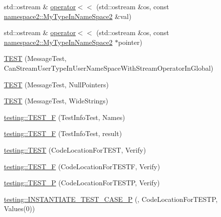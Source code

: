 \begin{DoxyCompactItemize}
std\+::ostream \& \mbox{\hyperlink{_obj__test_2lib_2googletest-release-1_88_81_2googletest_2test_2gtest__unittest_8cc_ab3cbb7adaeba5049e2c1907523f0c3e8}{operator$<$$<$}} (std\+::ostream \&os, const \mbox{\hyperlink{classnamespace2_1_1_my_type_in_name_space2}{namespace2\+::\+My\+Type\+In\+Name\+Space2}} \&val)
\item 
std\+::ostream \& \mbox{\hyperlink{_obj__test_2lib_2googletest-release-1_88_81_2googletest_2test_2gtest__unittest_8cc_a839d8a189a0c52bb7899a5b4b4b07ed1}{operator$<$$<$}} (std\+::ostream \&os, const \mbox{\hyperlink{classnamespace2_1_1_my_type_in_name_space2}{namespace2\+::\+My\+Type\+In\+Name\+Space2}} $\ast$pointer)
\item 
\mbox{\hyperlink{_obj__test_2lib_2googletest-release-1_88_81_2googletest_2test_2gtest__unittest_8cc_ad2b886ecfee880b5012c8d41b448f110}{T\+E\+ST}} (Message\+Test, Can\+Stream\+User\+Type\+In\+User\+Name\+Space\+With\+Stream\+Operator\+In\+Global)
\item 
\mbox{\hyperlink{_obj__test_2lib_2googletest-release-1_88_81_2googletest_2test_2gtest__unittest_8cc_a94b1c12b49eabc12e7418733576df02a}{T\+E\+ST}} (Message\+Test, Null\+Pointers)
\item 
\mbox{\hyperlink{_obj__test_2lib_2googletest-release-1_88_81_2googletest_2test_2gtest__unittest_8cc_a9c9e67e24350d636fa355b36ed230706}{T\+E\+ST}} (Message\+Test, Wide\+Strings)
\item 
\mbox{\hyperlink{namespacetesting_acd53db89097aba1468724d6446069b1e}{testing\+::\+T\+E\+S\+T\+\_\+F}} (Test\+Info\+Test, Names)
\item 
\mbox{\hyperlink{namespacetesting_ab00e29c00b3e29cdfa21d23b79dd3776}{testing\+::\+T\+E\+S\+T\+\_\+F}} (Test\+Info\+Test, result)
\item 
\mbox{\hyperlink{namespacetesting_af597d0ad4de0197141b78e9c1035e491}{testing\+::\+T\+E\+ST}} (Code\+Location\+For\+T\+E\+ST, Verify)
\item 
\mbox{\hyperlink{namespacetesting_a782ec43081903a0aaa6d009218eba2a8}{testing\+::\+T\+E\+S\+T\+\_\+F}} (Code\+Location\+For\+T\+E\+S\+TF, Verify)
\item 
\mbox{\hyperlink{namespacetesting_af05768b7e2f14652d2c4f274ba1a5544}{testing\+::\+T\+E\+S\+T\+\_\+P}} (Code\+Location\+For\+T\+E\+S\+TP, Verify)
\item 
\mbox{\hyperlink{namespacetesting_a5b049e97e9082df909e4a0f740ff5d02}{testing\+::\+I\+N\+S\+T\+A\+N\+T\+I\+A\+T\+E\+\_\+\+T\+E\+S\+T\+\_\+\+C\+A\+S\+E\+\_\+P}} (, Code\+Location\+For\+T\+E\+S\+TP, Values(0))
\item 

\end{DoxyCompactItemize}
